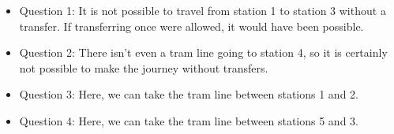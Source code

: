 \begin{itemize}
  \item Question 1: It is not possible to travel from station 1 to station 3 without a transfer. If transferring once were allowed, it would have been possible.
  \item Question 2: There isn't even a tram line going to station 4, so it is certainly not possible to make the journey without transfers.
  \item Question 3: Here, we can take the tram line between stations 1 and 2.
  \item Question 4: Here, we can take the tram line between stations 5 and 3.
\end{itemize}
